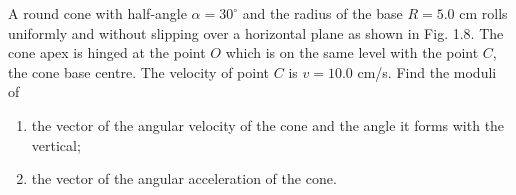 
\item A round cone with half-angle \( \alpha = 30^\circ \) and the radius of the base \( R = 5.0 \) cm rolls uniformly and without slipping over a horizontal plane as shown in Fig. 1.8. The cone apex is hinged at the point \( O \) which is on the same level with the point \( C \), the cone base centre. The velocity of point \( C \) is \( v = 10.0 \) cm/s. Find the moduli of
\begin{center}
\end{center}
\begin{enumerate}
    \item the vector of the angular velocity of the cone and the angle it forms with the vertical;
    \item the vector of the angular acceleration of the cone.
\end{enumerate}

